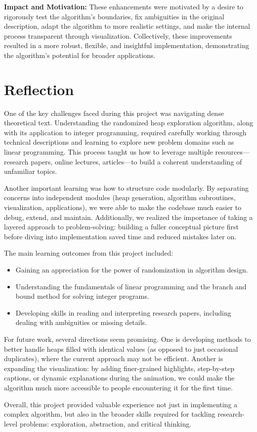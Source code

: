 \documentclass[conference]{IEEEtran}
\begin{document}
\vspace{0.5em}
\noindent
\textbf{Impact and Motivation:}  
These enhancements were motivated by a desire to rigorously test the algorithm's boundaries, fix ambiguities in the original description, adapt the algorithm to more realistic settings, and make the internal process transparent through visualization. Collectively, these improvements resulted in a more robust, flexible, and insightful implementation, demonstrating the algorithm’s potential for broader applications.

\section{Reflection}

One of the key challenges faced during this project was navigating dense theoretical text. Understanding the randomized heap exploration algorithm, along with its application to integer programming, required carefully working through technical descriptions and learning to explore new problem domains such as linear programming. This process taught us how to leverage multiple resources—research papers, online lectures, articles—to build a coherent understanding of unfamiliar topics.

Another important learning was how to structure code modularly. By separating concerns into independent modules (heap generation, algorithm subroutines, visualization, applications), we were able to make the codebase much easier to debug, extend, and maintain. Additionally, we realized the importance of taking a layered approach to problem-solving: building a fuller conceptual picture first before diving into implementation saved time and reduced mistakes later on.

The main learning outcomes from this project included:
\begin{itemize}
    \item Gaining an appreciation for the power of randomization in algorithm design.
    \item Understanding the fundamentals of linear programming and the branch and bound method for solving integer programs.
    \item Developing skills in reading and interpreting research papers, including dealing with ambiguities or missing details.
\end{itemize}

For future work, several directions seem promising. One is developing methods to better handle heaps filled with identical values (as opposed to just occasional duplicates), where the current approach may not be efficient. Another is expanding the visualization: by adding finer-grained highlights, step-by-step captions, or dynamic explanations during the animation, we could make the algorithm much more accessible to people encountering it for the first time.

Overall, this project provided valuable experience not just in implementing a complex algorithm, but also in the broader skills required for tackling research-level problems: exploration, abstraction, and critical thinking.



\end{document}
